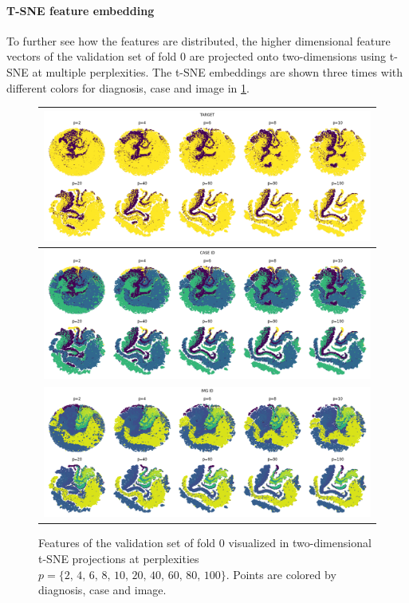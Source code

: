 \paragraph{T-SNE feature embedding}
To further see how the features are distributed, the higher dimensional feature vectors of the validation set of fold 0 are projected onto two-dimensions using t-SNE at multiple perplexities.
The t-SNE embeddings are shown three times with different colors for diagnosis, case and image in \cref{fig:tsne-features}.

\begin{figure}
    \centering
    \begin{tabular}[\linewidth]{c}
    \includegraphics[width=\linewidth]{pediatric-brain-tumours/images/target-tsne.png} \\
    \midrule
    \includegraphics[width=\linewidth]{pediatric-brain-tumours/images/case-tsne.png} \\
    \midrule
    \includegraphics[width=\linewidth]{pediatric-brain-tumours/images/img-tsne.png}
    \end{tabular}
    \caption[T-SNE projections of features]{
        Features of the validation set of fold 0 visualized in two-dimensional t-SNE projections at perplexities $p=\{2,\,4,\,6,\,8,\,10,\,20,\,40,\,60,\,80,\,100\}$.
        Points are colored by diagnosis, case and image.
    }
    \label{fig:tsne-features}
\end{figure}

